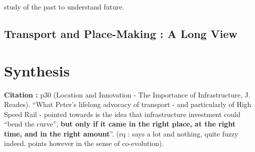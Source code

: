 study of the past to understand future.


\subsection{Transport and Place-Making : A Long View}





\section{Synthesis}


\textbf{Citation : } p30 (Location and Innovation - The Importance of Infrastructure, J. Reades). ``What Peter's lifelong advocacy of transport - and particularly of High Speed Rail - pointed towards is the idea that infrastructure investment could ``bend the curve'', \textbf{but only if it came in the right place, at the right time, and in the right amount}''. (rq : says a lot and nothing, quite fuzzy indeed. points however in the sense of co-evolution).















